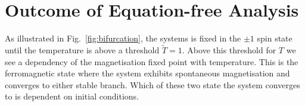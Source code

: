 \documentclass[11pt]{article}
\begin{document}
\section{Outcome of Equation-free Analysis}


As illustrated in Fig.~\ref{fig:bifurcation}, the systems is fixed in the $\pm 1$ spin state until the temperature is above a threshold $\widetilde{T}=1$. Above this threshold for $T$ we see a dependency of the magnetisation fixed point with temperature. This is the ferromagnetic state where the system exhibits spontaneous magnetisation and converges to either stable branch. Which of these two state the system converges to is dependent on initial conditions.

\begin{figure}[h]
        \centering
      \begin{subfigure}[b]{0.5\textwidth}
\end{subfigure}
\end{figure}
\end{document}
